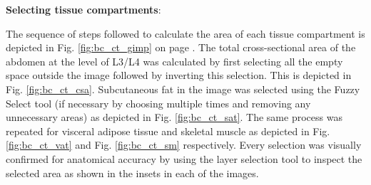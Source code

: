 \textbf{Selecting tissue compartments}:

The sequence of steps followed to calculate the area of each tissue compartment is depicted in Fig. \ref{fig:bc_ct_gimp} on page \pageref{fig:bc_ct_gimp}. 
The total cross-sectional area of the abdomen at the level of L3/L4 was calculated by first selecting all the empty space outside the image followed by inverting this selection. 
This is depicted in Fig. \ref{fig:bc_ct_csa}. 
Subcutaneous fat in the image was selected using the Fuzzy Select tool (if necessary by choosing multiple times and removing any unnecessary areas) as depicted in Fig. \ref{fig:bc_ct_sat}. 
The same process was repeated for visceral adipose tissue and skeletal muscle as depicted in Fig. \ref{fig:bc_ct_vat} and Fig. \ref{fig:bc_ct_sm} respectively. 
Every selection was visually confirmed for anatomical accuracy by using the layer selection tool to inspect the selected area as shown in the insets in each of the images.
